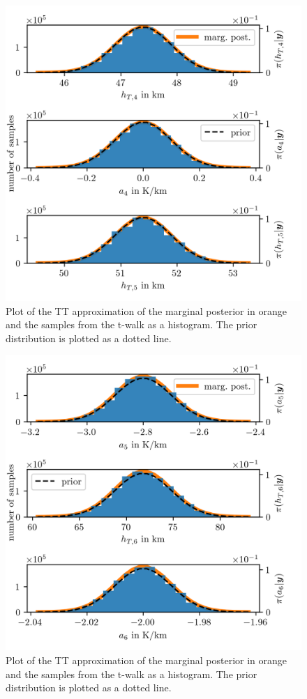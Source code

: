 \begin{figure}[ht!]
	\centering
	\includegraphics{PHdPTPost4.png}
	\caption[Histograms and TT approximation of posterior distribution as well as hyper-prior distribution.]{Plot of the TT approximation of the marginal posterior in orange and the samples from the t-walk as a histogram. The prior distribution is plotted as a dotted line.}
	\label{fig:PostHistTT4}
\end{figure}
\begin{figure}[ht!]
	\centering
	\includegraphics{PHdPTPost5.png}
	\caption[Histograms and TT approximation of posterior distribution as well as hyper-prior distribution.]{Plot of the TT approximation of the marginal posterior in orange and the samples from the t-walk as a histogram. The prior distribution is plotted as a dotted line.}
	\label{fig:PostHistTT5}
\end{figure}

